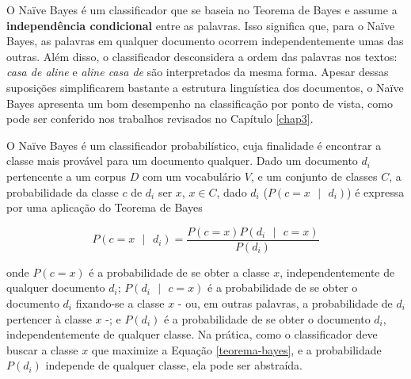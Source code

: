 O Naïve Bayes é um classificador que se baseia no Teorema de Bayes e assume a \textbf{independência condicional} entre as palavras. Isso significa que, para o Naïve Bayes, as palavras em qualquer documento ocorrem independentemente umas das outras. Além disso, o classificador desconsidera a ordem das palavras nos textos: \emph{casa de aline} e \emph{aline casa de} são interpretados da mesma forma. Apesar dessas suposições simplificarem bastante a estrutura linguística dos documentos, o Naïve Bayes apresenta um bom desempenho na classificação por ponto de vista, como pode ser conferido nos trabalhos revisados no Capítulo \ref{chap3}.%


O Naïve Bayes é um classificador probabilístico, cuja finalidade é encontrar a classe mais provável para um documento qualquer. Dado um documento \ensuremath{d_i} pertencente a um corpus \ensuremath{D} com um vocabulário \ensuremath{V}, e um conjunto de classes \ensuremath{C}, a probabilidade da classe \ensuremath{c} de \ensuremath{d_i} ser \ensuremath{x}, \ensuremath{x \in C}, dado \ensuremath{d_i} (\ensuremath{P(c = x\mbox{ }|\mbox{ }d_i)}) é expressa por uma aplicação do Teorema de Bayes \cite{naive-forty}

\begin{equation}
\label{teorema-bayes}
\ensuremath{P(c = x\mbox{ }|\mbox{ }d_i) = \frac{P(c = x)P(d_i\mbox{ }|\mbox{ }c = x)}{P(d_i)}}
\end{equation}

onde \ensuremath{P(c = x)} é a probabilidade de se obter a classe \ensuremath{x}, independentemente de qualquer documento \ensuremath{d_i}; \ensuremath{P(d_i\mbox{ }|\mbox{ }c = x)} é a probabilidade de se obter o documento \ensuremath{d_i} fixando-se a classe \ensuremath{x} - ou, em outras palavras, a probabilidade de \ensuremath{d_i} pertencer à classe \ensuremath{x} -; e \ensuremath{P(d_i)} é a probabilidade de se obter o documento \ensuremath{d_i}, independentemente de qualquer classe. Na prática, como o classificador deve buscar a classe \ensuremath{x} que maximize a Equação \ref{teorema-bayes}, e a probabilidade \ensuremath{P(d_i)} independe de qualquer classe, ela pode ser abstraída. 




